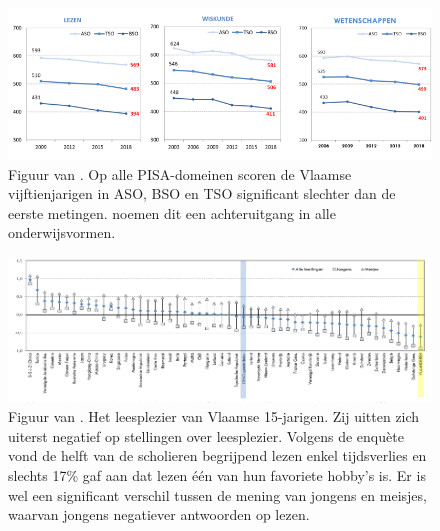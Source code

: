 \begin{figure}[H]
	\begin{center}
		\includegraphics[width=\linewidth]{img/oeso-graphic-pisa-trend-samenvatting.png}
	\end{center}
	\caption{Figuur van \textcite{DeMeyer2019}. Op alle PISA-domeinen scoren de Vlaamse vijftienjarigen in ASO, BSO en TSO significant slechter dan de eerste metingen. \textcite{DeMeyer2019} noemen dit een achteruitgang in alle onderwijsvormen.}
\end{figure}

\begin{figure}[H]
	\begin{center}
		\includegraphics[width=\linewidth]{img/oeso-graphic-leesplezier.png}
	\end{center}
	\caption{Figuur van \textcite{DeMeyer2019}. Het leesplezier van Vlaamse 15-jarigen. Zij uitten zich uiterst negatief op stellingen over leesplezier. Volgens de enquète vond de helft van de scholieren begrijpend lezen enkel tijdsverlies en slechts 17\% gaf aan dat lezen één van hun favoriete hobby's is. Er is wel een significant verschil tussen de mening van jongens en meisjes, waarvan jongens negatiever antwoorden op lezen.}
\end{figure}

